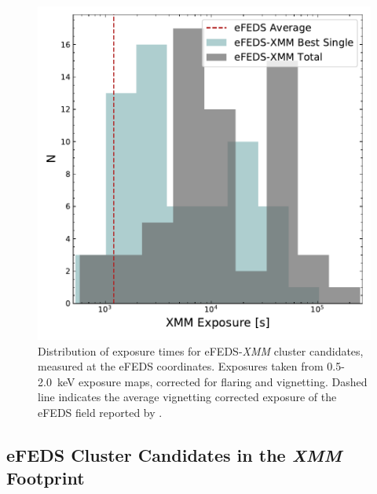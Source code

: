 \documentclass[fleqn,usenatbib]{mnras}
\begin{document}
\begin{figure}
    \centering
    \includegraphics[width=0.95\columnwidth]{images/xmm_exposures.pdf}
    \caption[]{Distribution of exposure times for eFEDS-{\em XMM} cluster candidates, measured at the eFEDS coordinates. Exposures taken from 0.5-2.0~keV exposure maps, corrected for flaring and vignetting. Dashed line indicates the average vignetting corrected exposure of the eFEDS field reported by \cite{efedsclustercat}.}
    \label{fig:xmmexposure}
\end{figure}

\subsection{eFEDS Cluster Candidates in the {\em XMM} Footprint}
\label{sec:eFEDS-XMM}
\end{document}
